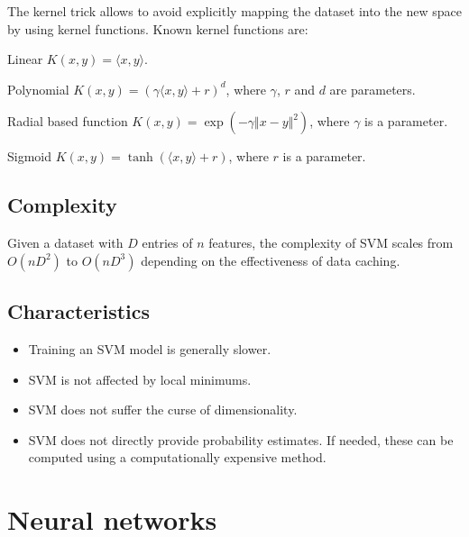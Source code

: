 The kernel trick allows to avoid explicitly mapping the dataset into the new space by using kernel functions.
Known kernel functions are:
\begin{descriptionlist}
    \item[Linear] $K(x, y) = \langle x, y \rangle$.
    \item[Polynomial] $K(x, y) = (\gamma \langle x, y \rangle + r)^d$, where $\gamma$, $r$ and $d$ are parameters.
    \item[Radial based function] $K(x, y) = \exp(-\gamma \Vert x - y \Vert^2)$, where $\gamma$ is a parameter.
    \item[Sigmoid] $K(x, y) = \tanh(\langle x, y \rangle + r)$, where $r$ is a parameter.
\end{descriptionlist}


\subsection{Complexity}
Given a dataset with $D$ entries of $n$ features, the complexity of SVM scales from $O(nD^2)$ to $O(nD^3)$
depending on the effectiveness of data caching.


\subsection{Characteristics}
\begin{itemize}
    \item Training an SVM model is generally slower.
    \item SVM is not affected by local minimums.
    \item SVM does not suffer the curse of dimensionality.
    \item SVM does not directly provide probability estimates. 
        If needed, these can be computed using a computationally expensive method.
\end{itemize}



\section{Neural networks}

